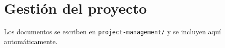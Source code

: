 \section{Gestión del proyecto}

Los documentos se escriben en \texttt{project-management/} y se incluyen aquí automáticamente.

\begingroup
\let\section\subsection
\let\subsection\subsubsection





\endgroup
